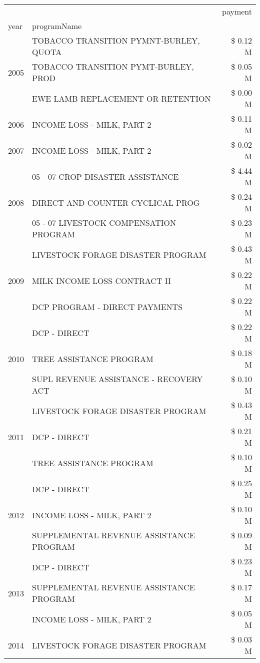 \begin{tabular}{llr}
\toprule
 &  & payment \\
year & programName &  \\
\midrule
\multirow[t]{3}{*}{2005} & TOBACCO TRANSITION PYMNT-BURLEY, QUOTA & \$ 0.12 M \\
 & TOBACCO TRANSITION PYMT-BURLEY, PROD & \$ 0.05 M \\
 & EWE LAMB REPLACEMENT OR RETENTION & \$ 0.00 M \\
\cline{1-3}
2006 & INCOME LOSS - MILK, PART 2 & \$ 0.11 M \\
\cline{1-3}
2007 & INCOME LOSS - MILK, PART 2 & \$ 0.02 M \\
\cline{1-3}
\multirow[t]{3}{*}{2008} & 05 - 07 CROP DISASTER ASSISTANCE & \$ 4.44 M \\
 & DIRECT AND COUNTER CYCLICAL PROG & \$ 0.24 M \\
 & 05 - 07 LIVESTOCK COMPENSATION PROGRAM & \$ 0.23 M \\
\cline{1-3}
\multirow[t]{3}{*}{2009} & LIVESTOCK FORAGE DISASTER  PROGRAM & \$ 0.43 M \\
 & MILK INCOME LOSS CONTRACT II & \$ 0.22 M \\
 & DCP PROGRAM - DIRECT PAYMENTS & \$ 0.22 M \\
\cline{1-3}
\multirow[t]{3}{*}{2010} & DCP - DIRECT & \$ 0.22 M \\
 & TREE ASSISTANCE PROGRAM & \$ 0.18 M \\
 & SUPL REVENUE ASSISTANCE - RECOVERY ACT & \$ 0.10 M \\
\cline{1-3}
\multirow[t]{3}{*}{2011} & LIVESTOCK FORAGE DISASTER PROGRAM & \$ 0.43 M \\
 & DCP - DIRECT & \$ 0.21 M \\
 & TREE ASSISTANCE PROGRAM & \$ 0.10 M \\
\cline{1-3}
\multirow[t]{3}{*}{2012} & DCP - DIRECT & \$ 0.25 M \\
 & INCOME LOSS - MILK, PART 2 & \$ 0.10 M \\
 & SUPPLEMENTAL REVENUE ASSISTANCE PROGRAM & \$ 0.09 M \\
\cline{1-3}
\multirow[t]{3}{*}{2013} & DCP - DIRECT & \$ 0.23 M \\
 & SUPPLEMENTAL REVENUE ASSISTANCE PROGRAM & \$ 0.17 M \\
 & INCOME LOSS - MILK, PART 2 & \$ 0.05 M \\
\cline{1-3}
\multirow[t]{3}{*}{2014} & LIVESTOCK FORAGE DISASTER PROGRAM & \$ 0.03 M \\

\end{tabular}

